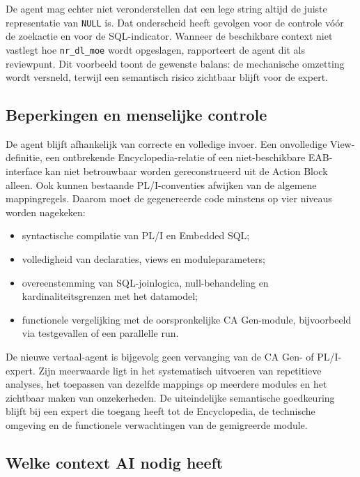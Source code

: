 De agent mag echter niet veronderstellen dat een lege string altijd de juiste
representatie van \texttt{NULL} is. Dat onderscheid heeft gevolgen voor de
controle vóór de zoekactie en voor de SQL-indicator. Wanneer de beschikbare
context niet vastlegt hoe \texttt{nr\_dl\_moe} wordt opgeslagen, rapporteert de
agent dit als reviewpunt. Dit voorbeeld toont de gewenste balans: de
mechanische omzetting wordt versneld, terwijl een semantisch risico zichtbaar
blijft voor de expert.

\subsection{Beperkingen en menselijke controle}
\label{sec:beperkingen-vertaal-agent}

De agent blijft afhankelijk van correcte en volledige invoer. Een onvolledige
View-definitie, een ontbrekende Encyclopedia-relatie of een niet-beschikbare
EAB-interface kan niet betrouwbaar worden gereconstrueerd uit de Action Block
alleen. Ook kunnen bestaande PL/I-conventies afwijken van de algemene
mappingregels. Daarom moet de gegenereerde code minstens op vier niveaus
worden nagekeken:
\begin{itemize}
    \item syntactische compilatie van PL/I en Embedded SQL;
    \item volledigheid van declaraties, views en moduleparameters;
    \item overeenstemming van SQL-joinlogica, null-behandeling en
    kardinaliteitsgrenzen met het datamodel;
    \item functionele vergelijking met de oorspronkelijke CA Gen-module,
    bijvoorbeeld via testgevallen of een parallelle run.
\end{itemize}

De nieuwe vertaal-agent is bijgevolg geen vervanging van de CA Gen- of
PL/I-expert. Zijn meerwaarde ligt in het systematisch uitvoeren van repetitieve
analyses, het toepassen van dezelfde mappings op meerdere modules en het
zichtbaar maken van onzekerheden. De uiteindelijke semantische goedkeuring
blijft bij een expert die toegang heeft tot de Encyclopedia, de technische
omgeving en de functionele verwachtingen van de gemigreerde module.

\subsection{Welke context AI nodig heeft}
\label{sec:automatisatie-context}

